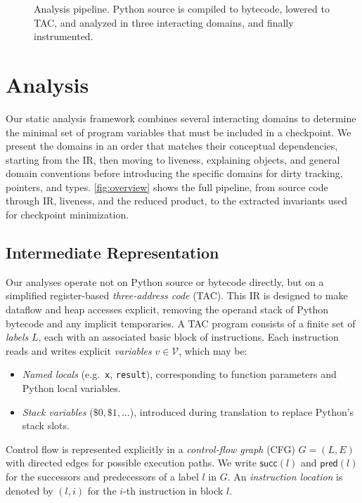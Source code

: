 \begin{figure}[t]
    \centering
    
    \caption{Analysis pipeline. Python source is compiled to bytecode, lowered to TAC, and analyzed in three interacting domains, and finally instrumented.}
    \label{fig:overview}
\end{figure}

\section{Analysis}
\label{sec:analysis}

Our static analysis framework combines several interacting domains to determine the minimal set of program variables that must be included in a checkpoint.  
We present the domains in an order that matches their conceptual dependencies, starting from the IR, then moving to liveness, explaining objects, and general domain conventions before introducing the specific domains for dirty tracking, pointers, and types. \autoref{fig:overview} shows the full pipeline, from source code through IR, liveness, and the reduced product, to the extracted invariants used for checkpoint minimization.

\subsection{Intermediate Representation}
Our analyses operate not on Python source or bytecode directly, but on a simplified register-based \emph{three-address code} (TAC).
This IR is designed to make dataflow and heap accesses explicit, removing the operand stack of Python bytecode and any implicit temporaries.
A TAC program consists of a finite set of \emph{labels} $L$, each with an associated basic block of instructions.
Each instruction reads and writes explicit \emph{variables} $v \in \mathcal{V}$, which may be:
\begin{itemize}
    \item \emph{Named locals} (e.g.\ \texttt{x}, \texttt{result}), corresponding to function parameters and Python local variables.
    \item \emph{Stack variables} ($\$0, \$1, \ldots$), introduced during translation to replace Python's stack slots.
\end{itemize}
Control flow is represented explicitly in a \emph{control-flow graph} (CFG) $G = (L, E)$ with directed edges for possible execution paths.
We write $\mathsf{succ}(l)$ and $\mathsf{pred}(l)$ for the successors and predecessors of a label $l$ in $G$.
An \emph{instruction location} is denoted by $(l, i)$ for the $i$-th instruction in block $l$.

